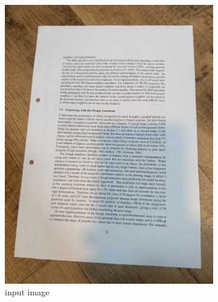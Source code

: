 \documentclass[bibliography=totoc]{scrartcl}
\begin{document}
\begin{figure}[H]
	\centering
	\begin{subfigure}[t]{0.3\linewidth}
		\includegraphics[width=\linewidth]{imgs/test/bad_lighting.jpg}
		\caption{input image}
		\label{subfig:shadow_input}
	\end{subfigure}
	\begin{subfigure}[t]{0.28\linewidth}

\end{subfigure}
\end{figure}
\end{document}
